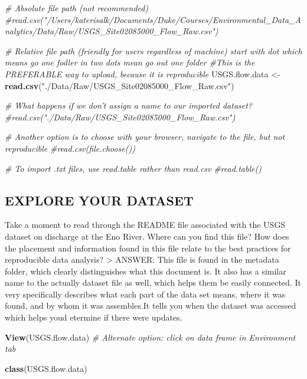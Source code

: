 \documentclass[]{article}
\newenvironment{Shaded}{\begin{snugshade}}{\end{snugshade}}
\newcommand{\CommentTok}[1]{\textcolor[rgb]{0.56,0.35,0.01}{\textit{#1}}}
\newcommand{\KeywordTok}[1]{\textcolor[rgb]{0.13,0.29,0.53}{\textbf{#1}}}
\newcommand{\NormalTok}[1]{#1}
\newcommand{\StringTok}[1]{\textcolor[rgb]{0.31,0.60,0.02}{#1}}
\begin{document}
\begin{Shaded}
\begin{Highlighting}[]
\CommentTok{# Absolute file path (not recommended)}
\CommentTok{#read.csv("/Users/katerisalk/Documents/Duke/Courses/Environmental_Data_Analytics/Data/Raw/USGS_Site02085000_Flow_Raw.csv")}

\CommentTok{# Relative file path (friendly for users regardless of machine) start with dot which means go one fodler in      two dots mean go out one folder}
\CommentTok{#This is the PREFERABLE way to upload, because it is reproducible}
\NormalTok{USGS.flow.data <-}\StringTok{ }\KeywordTok{read.csv}\NormalTok{(}\StringTok{"./Data/Raw/USGS_Site02085000_Flow_Raw.csv"}\NormalTok{)}

\CommentTok{# What happens if we don't assign a name to our imported dataset?}
\CommentTok{#read.csv("./Data/Raw/USGS_Site02085000_Flow_Raw.csv")}

\CommentTok{# Another option is to choose with your browser, navigate to the file, but not reproducible}
\CommentTok{#read.csv(file.choose())}

\CommentTok{# To import .txt files, use read.table rather than read.csv}
\CommentTok{#read.table()}
\end{Highlighting}
\end{Shaded}

\hypertarget{explore-your-dataset}{%
\subsection{EXPLORE YOUR DATASET}\label{explore-your-dataset}}

Take a moment to read through the README file associated with the USGS
dataset on discharge at the Eno River. Where can you find this file? How
does the placement and information found in this file relate to the best
practices for reproducible data analysis? \textgreater{} ANSWER: This
file is found in the metadata folder, which clearly distinguishes what
this document is. It also has a similar name to the actually dataset
file as well, which helps them be easily connected. It very specifically
describes what each part of the data set means, where it was found, and
by whom it was assembles.It tells you when the dataset was accessed
which helps youd etermine if there were updates.

\begin{Shaded}
\begin{Highlighting}[]
\KeywordTok{View}\NormalTok{(USGS.flow.data)}
\CommentTok{# Alternate option: click on data frame in Environment tab}

\KeywordTok{class}\NormalTok{(USGS.flow.data)}
\end{Highlighting}
\end{Shaded}
\end{document}

